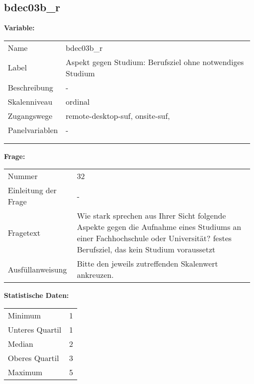 	
	
	\subsection{bdec03b\_r}
	\label{subSection:bdec03b_r}

	\noindent\textbf{Variable:}\\
		\begin{tabular}{lL{11.3cm}}
			\label{tableVariable:bdec03b_r}
			Name & bdec03b\_r \\
			Label & Aspekt gegen Studium: Berufsziel ohne notwendiges Studium \\
			Beschreibung & - \\
			Skalenniveau & ordinal \\
			Zugangswege &
				remote-desktop-suf,
				onsite-suf,
 \\
			Panelvariablen & -
			 \\
			 \\
 \\
		\end{tabular}

		\vspace*{1 cm}
		\noindent\textbf{Frage:}\\
		\begin{tabular}{lL{11.3cm}}
			\label{tableQuestion:bdec03b_r}
			Nummer & 32 \\
			Einleitung der Frage & - \\
			Fragetext & Wie stark sprechen aus Ihrer Sicht folgende Aspekte gegen die Aufnahme eines Studiums an einer Fachhochschule oder Universität?
festes Berufsziel, das kein Studium voraussetzt \\
			Ausfüllanweisung & Bitte den jeweils zutreffenden Skalenwert ankreuzen. \\
		\end{tabular}


		\vspace*{1 cm}
		\noindent\textbf{Statistische Daten:}\\
			\begin{tabular}{ll}
				\label{tableStatistics:bdec03b_r}
					Minimum & 1 \\
					Unteres Quartil & 1 \\
					Median & 2 \\
					Oberes Quartil & 3 \\
					Maximum & 5 \\
			\end{tabular}



